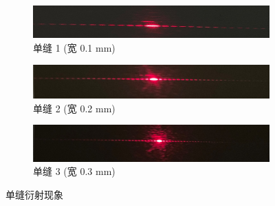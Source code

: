 \documentclass[UTF8]{article}
\theoremstyle{MyLineTheoremStyle} %
\theoremstyle{MyBlockTheoremStyle} %
\theoremstyle{MySubsubsectionStyle} %
\begin{document}
\begin{figure}[H]\centering
\begin{subfigure}[b]{\columnwidth}\centering
    \includegraphics[width=\columnwidth]{assets/4 衍射实验/狭缝 1.jpg}
    \caption{单缝 1 (宽 0.1 mm)}
\end{subfigure}\hfill
\begin{subfigure}[b]{\columnwidth}\centering
    \includegraphics[width=\columnwidth]{assets/4 衍射实验/狭缝 2.jpg}
    \caption{单缝 2 (宽 0.2 mm)}
\end{subfigure}
\begin{subfigure}[b]{\columnwidth}\centering
    \includegraphics[width=\columnwidth]{assets/4 衍射实验/狭缝 3.jpg}
    \caption{单缝 3 (宽 0.3 mm)}
\end{subfigure}
\caption{单缝衍射现象}
\end{figure}
\end{document}
